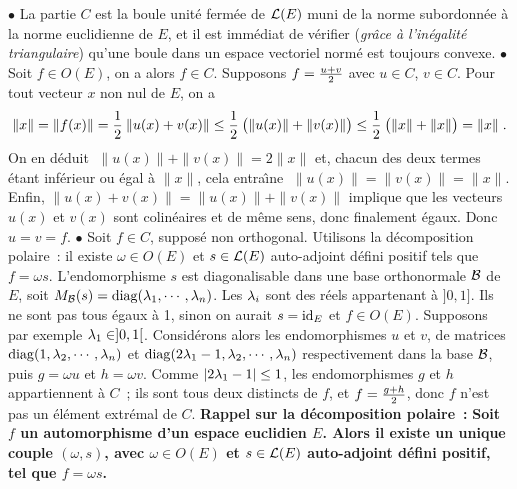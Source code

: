 \documentclass{article}
\begin{document}
\msk
\cl{- - - - - - - - - - - - - - - - - - - - - - - - - - - - - -}
\msk

$\bullet$ La partie $C$ est la boule unit\'e ferm\'ee de ${\cal L}(E)$ muni de la norme subordonn\'ee \`a la norme euclidienne de $E$, et il est imm\'ediat de v\'erifier ({\it gr\^ace \`a l'in\'egalit\'e triangulaire}) qu'une boule dans un espace vectoriel norm\'e est toujours convexe.
\msk
$\bullet$ Soit $f\in O(E)$, on a alors $f\in C$. Supposons $f={u+v\over2}$ avec $u\in C$, $v\in C$. Pour tout vecteur $x$ non nul de $E$, on a\vv
$$\|x\|=\|f(x)\|={1\over2}\>\|u(x)+v(x)\|\leq{1\over2}\>\big(\|u(x)\|+\|v(x)\|\big)\leq{1\over2}\>\big(\|x\|+\|x\|\big)=\|x\|\;.$$
On en d\'eduit $\;\|u(x)\|+\|v(x)\|=2\|x\|$ et, chacun des deux termes \'etant inf\'erieur ou \'egal \`a $\|x\|$, cela entra\^\i ne $\;\|u(x)\|=\|v(x)\|=\|x\|$. Enfin, $\|u(x)+v(x)\|=\|u(x)\|+\|v(x)\|$ implique que les vecteurs $u(x)$ et $v(x)$ sont colin\'eaires et de m\^eme sens, donc finalement \'egaux. Donc $u=v=f$.
\msk
$\bullet$ Soit $f\in C$, suppos\'e non orthogonal. Utilisons la d\'ecomposition polaire~: il existe $\omega\in O(E)$ et $s\in{\cal L}(E)$ auto-adjoint d\'efini positif tels que $f=\omega s$. L'endomorphisme $s$ est diagonalisable dans une base orthonormale ${\cal B}$ de $E$, soit $M_{{\cal B}}(s)=\mathop{\rm diag}\nolimits(\lambda_1,\cdots,\lambda_n)$. Les $\lambda_i$ sont des r\'eels appartenant \`a $]0,1]$. Ils ne sont pas tous \'egaux \`a 1, sinon on aurait $s=\mathop{\rm id}\nolimits_E$ et $f\in O(E)$. Supposons par exemple $\lambda_1\in]0,1[$. Consid\'erons alors les endomorphismes $u$ et $v$, de matrices $\mathop{\rm diag}\nolimits(1,\lambda_2,\cdots,\lambda_n)$ et $\mathop{\rm diag}\nolimits(2\lambda_1-1,\lambda_2,\cdots,\lambda_n)$ respectivement dans la base ${\cal B}$, puis $g=\omega u$ et $h=\omega v$. Comme $|2\lambda_1-1|\leq1$, les endomorphismes $g$ et $h$ appartiennent \`a $C$~; ils sont tous deux distincts de $f$, et $f={g+h\over2}$, donc $f$ n'est pas un \'el\'ement extr\'emal de $C$.
\msk
{\bf Rappel sur la d\'ecomposition polaire~:}\ssk
{\bf Soit $f$ un automorphisme d'un espace euclidien $E$. Alors il existe un unique couple $(\omega,s)$, avec $\omega\in O(E)$ et $s\in{\cal L}(E)$ auto-adjoint d\'efini positif, tel que $f=\omega s$.}\ssk
\end{document}
